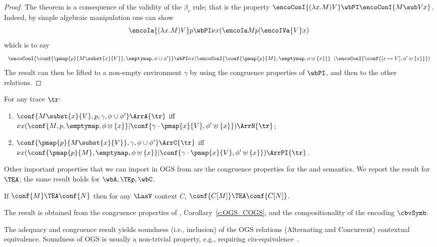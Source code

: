 \begin{proof}
The theorem is a  consequence of the validity of the $\beta_v$ rule; that
is the property $  \encoConI{ (\lambda x. M) V }  \wbPI   \encoConI{  M \sub V x }  $. 
Indeed, by simple algebraic manipulation one can show 
$$   \encoIa{(\lambda x. M) V} p 
 \wbPI  \nu x( \encoIa M p |   \encoIVa {V} x)$$
which is to say
$$ 
\begin{array}{lc}
  \encoConI{\conf{\pmap{p}{M\subst{x}{V}},\emptymap ,\phi\cup\phi'}} 
 \wbPI
 \nu x(
   \encoConI{\conf{\pmap{p}{M},\emptymap,\phi \uplus \{x\}}} 
     \ \ | \encoConI{\conf{[x \mapsto V],\phi' \uplus \{x\}}})
\end{array} 
$$
The result can then be lifted to a  non-empty environment $ \gamma $ by using the congruence
properties of $\wbPI$, and then to the other relations.
\end{proof}

\begin{corollary}
For any trace $\tr$:
 \begin{enumerate}
 \item  $\conf{M\subst{x}{V},p,\gamma,\phi\cup\phi'} \ArrA{\tr}$
 iff $\nu x(
   \conf{M,p,\emptymap,\phi \uplus \{x\}}
      | \conf{\gamma \cdot\pmap{x}{V},\phi' \uplus \{x\}}) \ArrN{\tr}$;
 \item $\conf{\pmap{p}{M\subst{x}{V}},\gamma,\phi\cup\phi'} \ArrC{\tr}$
 iff $\nu x(
   \conf{\pmap{p}{M},\emptymap,\phi \uplus \{x\}}
      | \conf{\gamma \cdot\pmap{x}{V},\phi' \uplus \{x\}}) \ArrPI{\tr}$.
\end{enumerate}
\end{corollary}

\noindent
Other important properties that we can import in OGS from \piI
are the congruence properties for the \AOGS and \COGS semantics. 
We report the result for  $\TEA$; the same result holds for 
$\wbA,\TEp, \wbC$.
\begin{theorem}
 If $\conf{M} \TEA \conf{N}$
 then for any $\LasV$  context $C$, $\conf{C[M]} \TEA \conf{C[N]}$.
\end{theorem}

\noindent
The result is obtained  from the congruence properties of \piI, 
Corollary~\ref{c:OGS_COGS}, and the compositionality
of the encoding $\cbvSymb$.

\iflong
The adequacy and congruence result yields soundness (i.e., inclusion) 
of the OGS relations (Alternating and
Concurrent) \wrt contextual equivalence. Soundness of OGS
is usually a non-trivial property, e.g., requiring 
ciu-equivalence~\cite{laird2007}.


